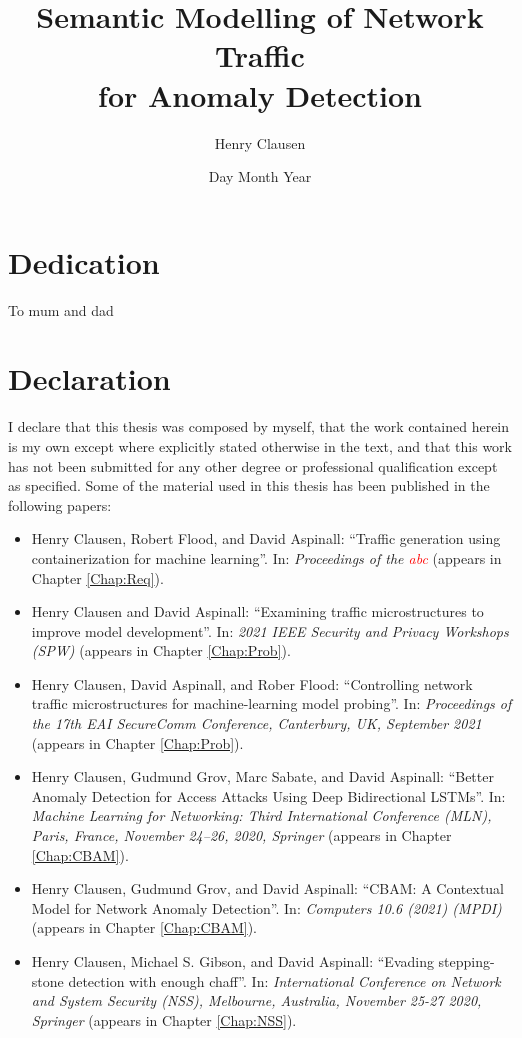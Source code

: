 \documentclass[a4paper,12pt,twoside]{report}
\title{
{Semantic Modelling of Network Traffic\\ for Anomaly Detection}\\
}
\author{Henry Clausen}
\date{Day Month Year}
\begin{document}




\chapter*{Dedication}
To mum and dad

\chapter*{Declaration}

I declare that this thesis was composed by myself, that the work contained herein is my own except where explicitly stated otherwise in the text, and that this work has not been submitted for any other degree or professional qualification except as specified. Some of the material used in this thesis has been published in the following papers:

\begin{itemize}
\item Henry Clausen, Robert Flood, and David Aspinall: ``Traffic generation using containerization for machine learning''. In: \textit{Proceedings of the \textcolor{red}{abc}} (appears in Chapter \ref{Chap:Req}). 
\item Henry Clausen and David Aspinall: ``Examining traffic microstructures to improve model development''. In: \textit{2021 IEEE Security and Privacy Workshops (SPW)} (appears in Chapter \ref{Chap:Prob}).
\item Henry Clausen, David Aspinall, and Rober Flood: ``Controlling network traffic microstructures for machine-learning model probing''. In: \textit{Proceedings of the 17th EAI SecureComm Conference, Canterbury, UK, September 2021} (appears in Chapter \ref{Chap:Prob}).
\item Henry Clausen, Gudmund Grov, Marc Sabate, and David Aspinall: ``Better Anomaly Detection for Access Attacks Using Deep Bidirectional LSTMs''. In: \textit{Machine Learning for Networking: Third International Conference (MLN), Paris, France, November 24–26, 2020, Springer}  (appears in Chapter \ref{Chap:CBAM}).
\item Henry Clausen, Gudmund Grov, and David Aspinall: ``CBAM: A Contextual Model for Network Anomaly Detection''. In: \textit{Computers 10.6 (2021) (MPDI)} (appears in Chapter \ref{Chap:CBAM}).
\item Henry Clausen, Michael S. Gibson, and David Aspinall: ``Evading stepping-stone detection with enough chaff''. In: \textit{International Conference on Network and System Security (NSS), Melbourne, Australia, November 25-27 2020, Springer} (appears in Chapter \ref{Chap:NSS}).
\end{itemize}
\end{document}
